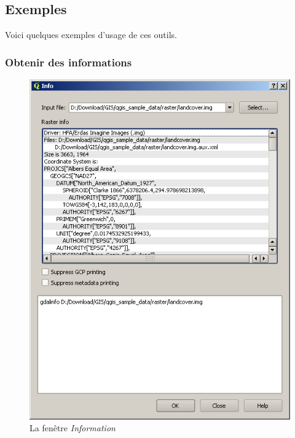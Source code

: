 {\subsection{Exemples}\label{gdal_examples}
Voici quelques exemples d'usage de ces outils.
\subsubsection{Obtenir des informations}
\begin{figure}[ht]
   \centering
   \caption{La fenêtre \emph{Information} \nixcaption}\label{gdalinfo}
   \includegraphics[clip=true, width=12cm]{plugins_gdaltools_images/gdalinfo}
\end{figure}

}
